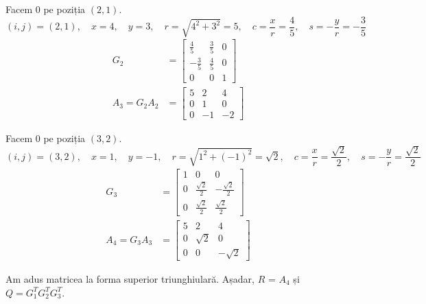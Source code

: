 \documentclass{exam}
\begin{document}
Facem 0 pe poziția $(2, 1)$.
\begin{equation*}
	(i, j) = (2, 1), \quad x = 4, \quad y = 3, \quad r = \sqrt{4^2 + 3^2} = 5, \quad c = \frac{x}{r} = \frac{4}{5}, \quad s = -\frac{y}{r} = -\frac{3}{5}
\end{equation*}
\begin{align*}
	G_2           & = \begin{bmatrix}
		                  \frac{4}{5}  & \frac{3}{5} & 0 \\
		                  -\frac{3}{5} & \frac{4}{5} & 0 \\
		                  0            & 0           & 1
	                  \end{bmatrix} \\
	A_3 = G_2 A_2 & = \begin{bmatrix}
		                  5 & 2  & 4  \\
		                  0 & 1  & 0  \\
		                  0 & -1 & -2
	                  \end{bmatrix}
\end{align*}

Facem 0 pe poziția $(3, 2)$.
\begin{equation*}
	(i, j) = (3, 2), \quad x = 1, \quad y = -1, \quad r = \sqrt{1^2 + (-1)^2} = \sqrt{2}, \quad c = \frac{x}{r} = \frac{\sqrt{2}}{2}, \quad s = -\frac{y}{r} = \frac{\sqrt{2}}{2}
\end{equation*}
\begin{align*}
	G_3           & = \begin{bmatrix}
		                  1 & 0                  & 0                   \\
		                  0 & \frac{\sqrt{2}}{2} & -\frac{\sqrt{2}}{2} \\
		                  0 & \frac{\sqrt{2}}{2} & \frac{\sqrt{2}}{2}
	                  \end{bmatrix} \\
	A_4 = G_3 A_3 & = \begin{bmatrix}
		                  5 & 2        & 4         \\
		                  0 & \sqrt{2} & 0         \\
		                  0 & 0        & -\sqrt{2}
	                  \end{bmatrix}
\end{align*}

Am adus matricea la forma superior triunghiulară. Așadar, $R$ = $A_4$ și
$Q = G_1^T G_2^T G_3^T$.
\end{document}
